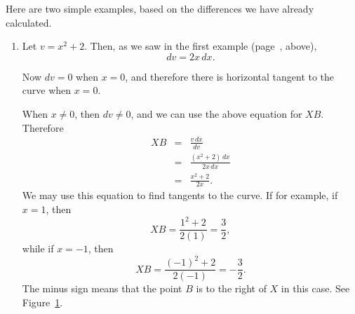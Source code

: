 \documentclass[twoside,openright]{article}
\begin{document}
 Here are two simple examples, based on the differences we have already calculated.
\begin{enumerate}
\item Let $v = x^2 + 2.$  Then, as we saw in the first example (page~\pageref{ex1}, above),
$$dv = 2x\,dx.$$

Now $dv=0$ when $x=0$, and therefore there is horizontal tangent to the curve when $x=0$.

When $x\neq 0$, then $dv \neq 0$, and we can use the above equation for $XB$.  Therefore
\begin{eqnarray*}
XB & = & \frac{v\, dx}{dv}\\
& = & \frac{(x^2 + 2)\,dx}{2x\,dx}\\
& = & \frac{x^2 + 2}{2x}.
\end{eqnarray*}
We may use this equation to find tangents to the curve.  If for example, if $x=1$, then
$$XB = \frac{1^2 +2}{2(1)} = \frac{3}{2},$$
while if $x=-1$, then
$$XB = \frac{(-1)^2 + 2}{2(-1)} = -\frac{3}{2}.$$
The minus sign means that the point $B$ is to the right of $X$ in this
case.  See Figure~\ref{tangex1}.
\begin{figure}[htp]
\begin{center}
\caption{}
\label{tangex1}
\vspace{-10pt}
\end{center}
\end{figure}


\end{enumerate}
\end{document}
